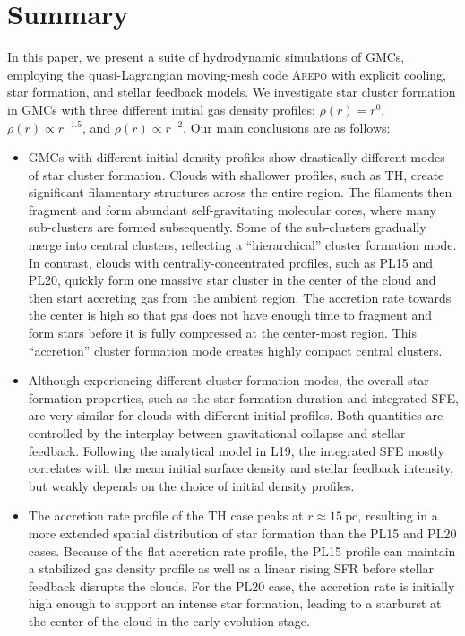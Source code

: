 \documentclass[fleqn,usenatbib]{mnras}
\begin{document}
\section{Summary}
\label{sec:summary}

In this paper, we present a suite of hydrodynamic simulations of GMCs, employing the quasi-Lagrangian moving-mesh code \textsc{Arepo} with explicit cooling, star formation, and stellar feedback models. We investigate star cluster formation in GMCs with three different initial gas density profiles: $\rho(r)= r^0$, $\rho(r)\propto r^{-1.5}$, and $\rho(r)\propto r^{-2}$. 
Our main conclusions are as follows:

\begin{itemize}
    \item GMCs with different initial density profiles show drastically different modes of star cluster formation. Clouds with shallower profiles, such as TH, create significant filamentary structures across the entire region.
    The filaments then fragment and form abundant self-gravitating molecular cores, where many sub-clusters are formed subsequently. Some of the sub-clusters gradually merge into central clusters, reflecting a ``hierarchical'' cluster formation mode. In contrast, clouds with centrally-concentrated profiles, such as PL15 and PL20, quickly form one massive star cluster in the center of the cloud and then start accreting gas from the ambient region. The accretion rate towards the center is high so that gas does not have enough time to fragment and form stars before it is fully compressed at the center-most region. This ``accretion'' cluster formation mode creates highly compact central clusters.
    
    \item Although experiencing different cluster formation modes, the overall star formation properties, such as the star formation duration and integrated SFE, are very similar for clouds with different initial profiles. Both quantities are controlled by the interplay between gravitational collapse and stellar feedback. Following the analytical model in L19, the integrated SFE mostly correlates with the mean initial surface density and stellar feedback intensity, but weakly depends on the choice of initial density profiles.
    
    \item The accretion rate profile of the TH case peaks at $r\approx 15\ \mathrm{pc}$, resulting in a more extended spatial distribution of star formation than the PL15 and PL20 cases. Because of the flat accretion rate profile, the PL15 profile can maintain a stabilized gas density profile as well as a linear rising SFR before stellar feedback disrupts the clouds. For the PL20 case, the accretion rate is initially high enough to support an intense star formation, leading to a starburst at the center of the cloud in the early evolution stage.
    

\end{itemize}
\end{document}
